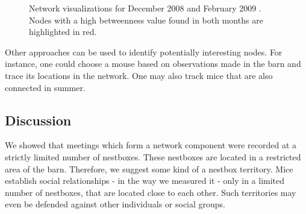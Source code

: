\begin{figure}[htpb]%
	\centering 
	
	\qquad 			
	\caption[Network visualizations for December 2008 and February 2009 ]{Network visualizations for December 2008  and February 2009 . Nodes with a high betweenness value found in both months are highlighted in red.}
	 \label{fig:pi_nodes_dec_feb}
\end{figure} 

Other approaches can be used to identify potentially interesting nodes. For instance, one could choose a mouse based on observations made in the barn and trace its locations in the network. One may also track mice that are also connected in summer.

\clearpage

\subsection{Discussion}
\label{subsec:discussion}

We showed that meetings which form a network component were recorded at a strictly limited number of nestboxes. These nestboxes are located in a restricted area of the barn. Therefore, we suggest some kind of a nestbox territory. Mice establish social relationships - in the way we measured it - only in a limited number of nestboxes, that are located close to each other. Such territories may even be defended against other individuals or social groups.

